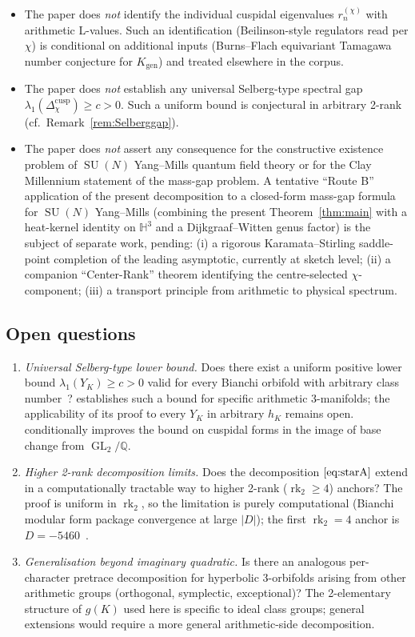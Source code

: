 \documentclass[11pt,a4paper,reqno]{amsart}
\theoremstyle{definition}
\DeclareMathOperator{\GL}{GL}
\DeclareMathOperator{\SU}{SU}
\DeclareMathOperator{\rk}{rk}
\newcommand{\HH}{\mathbb{H}}
\newcommand{\QQ}{\mathbb{Q}}
\newcommand{\YK}{Y_K}
\newcommand{\gK}{g(K)}
\newcommand{\Kgen}{K_{\mathrm{gen}}}
\begin{document}
\begin{itemize}[leftmargin=2em]
  \item The paper does \emph{not} identify the individual cuspidal eigenvalues $r_n^{(\chi)}$ with arithmetic L-values. Such an identification (Beilinson-style regulators read per $\chi$) is conditional on additional inputs (Burns--Flach equivariant Tamagawa number conjecture for $\Kgen$) and treated elsewhere in the corpus.
  \item The paper does \emph{not} establish any universal Selberg-type spectral gap $\lambda_1(\Delta_\chi^{\mathrm{cusp}})\geq c>0$. Such a uniform bound is conjectural in arbitrary 2-rank (cf.~Remark~\ref{rem:Selberggap}).
  \item The paper does \emph{not} assert any consequence for the constructive existence problem of $\SU(N)$ Yang--Mills quantum field theory or for the Clay Millennium statement of the mass-gap problem. A tentative ``Route B'' application of the present decomposition to a closed-form mass-gap formula for $\SU(N)$ Yang--Mills (combining the present Theorem~\ref{thm:main} with a heat-kernel identity on $\HH^3$ and a Dijkgraaf--Witten genus factor) is the subject of separate work, pending: (i) a rigorous Karamata--Stirling saddle-point completion of the leading asymptotic, currently at sketch level; (ii) a companion ``Center-Rank'' theorem identifying the centre-selected $\chi$-component; (iii) a transport principle from arithmetic to physical spectrum.
\end{itemize}

\subsection{Open questions}\label{ss:open}

\begin{enumerate}[label=(Q\arabic*),leftmargin=2em]
  \item \emph{Universal Selberg-type lower bound.} Does there exist a uniform positive lower bound $\lambda_1(\YK)\geq c>0$ valid for every Bianchi orbifold with arbitrary class number~\cite{Remondiere2026Survey}? \cite{Sarnak1983} establishes such a bound for specific arithmetic 3-manifolds; the applicability of its proof to every $\YK$ in arbitrary $h_K$ remains open. \cite{Kim2003} conditionally improves the bound on cuspidal forms in the image of base change from $\GL_2/\QQ$.
  \item \emph{Higher 2-rank decomposition limits.} Does the decomposition $\eqref{eq:starA}$ extend in a computationally tractable way to higher 2-rank ($\rk_2\geq 4$) anchors? The proof is uniform in $\rk_2$, so the limitation is purely computational (Bianchi modular form package convergence at large $|D|$); the first $\rk_2=4$ anchor is $D=-5460$~\cite{Remondiere2026Faltings}.
  \item \emph{Generalisation beyond imaginary quadratic.} Is there an analogous per-character pretrace decomposition for hyperbolic 3-orbifolds arising from other arithmetic groups (orthogonal, symplectic, exceptional)? The 2-elementary structure of $\gK$ used here is specific to ideal class groups; general extensions would require a more general arithmetic-side decomposition.
\end{enumerate}



\end{document}
